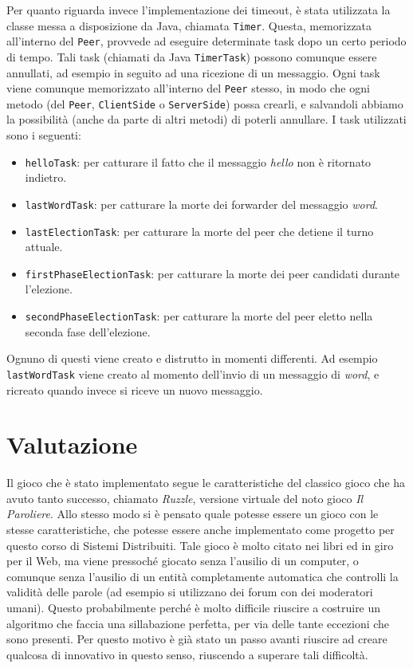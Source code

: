 \documentclass[10.5pt]{article}
\begin{document}
Per quanto riguarda invece l'implementazione dei timeout, è stata utilizzata la classe messa a disposizione da Java, chiamata \texttt{Timer}. Questa, memorizzata all'interno del \texttt{Peer}, provvede ad eseguire determinate task dopo un certo periodo di tempo. Tali task (chiamati da Java \texttt{TimerTask}) possono comunque essere annullati, ad esempio in seguito ad una ricezione di un messaggio. Ogni task viene comunque memorizzato all'interno del \texttt{Peer} stesso, in modo che ogni metodo (del \texttt{Peer}, \texttt{ClientSide} o \texttt{ServerSide}) possa crearli, e salvandoli abbiamo la possibilità (anche da parte di altri metodi) di poterli annullare. I task utilizzati sono i seguenti:

\begin{itemize}
\item \texttt{helloTask}: per catturare il fatto che il messaggio \textit{hello} non è ritornato indietro.
\item \texttt{lastWordTask}: per catturare la morte dei forwarder del messaggio \textit{word}.
\item \texttt{lastElectionTask}: per catturare la morte del peer che detiene il turno attuale.
\item \texttt{firstPhaseElectionTask}: per catturare la morte dei peer candidati durante l'elezione.
\item \texttt{secondPhaseElectionTask}: per catturare la morte del peer eletto nella seconda fase dell'elezione.
\end{itemize}

Ognuno di questi viene creato e distrutto in momenti differenti. Ad esempio \texttt{lastWordTask} viene creato al momento dell'invio di un messaggio di \textit{word}, e ricreato quando invece si riceve un nuovo messaggio.

\section{Valutazione}

Il gioco che è stato implementato segue le caratteristiche del classico gioco che ha avuto tanto successo, chiamato \textit{Ruzzle}, versione virtuale del noto gioco \textit{Il Paroliere}. Allo stesso modo si è pensato quale potesse essere un gioco con le stesse caratteristiche, che potesse essere anche implementato come progetto per questo corso di Sistemi Distribuiti. Tale gioco è molto citato nei libri ed in giro per il Web, ma viene pressoché giocato senza l'ausilio di un computer, o comunque senza l'ausilio di un entità completamente automatica che controlli la validità delle parole (ad esempio si utilizzano dei forum con dei moderatori umani). Questo probabilmente perché è molto difficile riuscire a costruire un algoritmo che faccia una sillabazione perfetta, per via delle tante eccezioni che sono presenti. Per questo motivo è già stato un passo avanti riuscire ad creare qualcosa di innovativo in questo senso, riuscendo a superare tali difficoltà.
\end{document}
